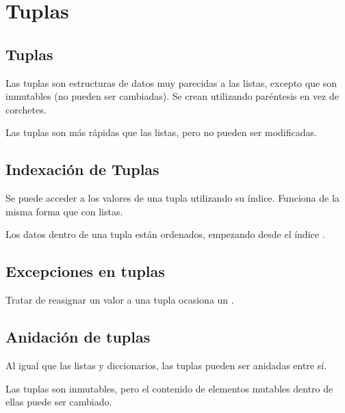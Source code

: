 \chapter{Tuplas}

\section{Tuplas}

Las tuplas son estructuras de datos muy parecidas a las listas, excepto que son inmutables (no pueden ser cambiadas).
Se crean utilizando paréntesis en vez de corchetes.


Las tuplas son más rápidas que las listas, pero no pueden ser modificadas.

\section{Indexación de Tuplas}

Se puede acceder a los valores de una tupla utilizando su índice.
Funciona de la misma forma que con listas.


Los datos dentro de una tupla están ordenados, empezando desde el índice .

\section{Excepciones en tuplas}

Tratar de reasignar un valor a una tupla ocasiona un .


\section{Anidación de tuplas}

Al igual que las listas y diccionarios, las tuplas pueden ser anidadas entre sí.

Las tuplas son inmutables, pero el contenido de elementos mutables dentro de ellas puede ser cambiado.


